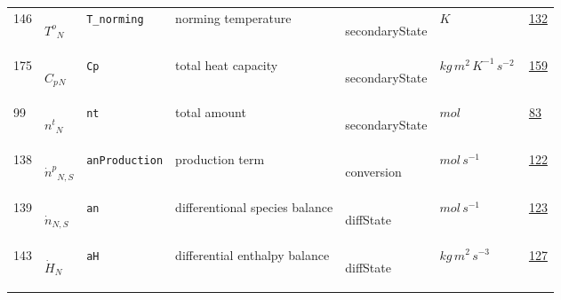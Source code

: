 \begin{longtable}{|p{1cm}|p{2.5cm}|p{4.5cm}|p{8cm}|p{3.0cm}|p{3cm}|p{1cm}|}
            146
             & \hypertarget{"v:146"}{ $ {{T^o}}{_{N}} $}
             & \verb|T_norming|
             & norming temperature
             & \begin{lay}secondaryState \end{lay}
             & $ K \, $
             &                 \hyperlink{"e:132"}{ 132 }
                 \\
            175
             & \hypertarget{"v:175"}{ $ {{C_p}}{_{N}} $}
             & \verb|Cp|
             & total heat capacity
             & \begin{lay}secondaryState \end{lay}
             & $ kg \,m^{2} \,K^{-1} \,s^{-2} \, $
             &                 \hyperlink{"e:159"}{ 159 }
                 \\
            99
             & \hypertarget{"v:99"}{ $ {{n^t}}{_{N}} $}
             & \verb|nt|
             & total amount
             & \begin{lay}secondaryState \end{lay}
             & $ mol \, $
             &                 \hyperlink{"e:83"}{ 83 }
                 \\
            138
             & \hypertarget{"v:138"}{ $ {{\dot{n}^p}}{_{N, S}} $}
             & \verb|anProduction|
             & production term
             & \begin{lay}conversion \end{lay}
             & $ mol \,s^{-1} \, $
             &                 \hyperlink{"e:122"}{ 122 }
                 \\
            139
             & \hypertarget{"v:139"}{ $ {{\dot{n}}}{_{N, S}} $}
             & \verb|an|
             & differentional species balance
             & \begin{lay}diffState \end{lay}
             & $ mol \,s^{-1} \, $
             &                 \hyperlink{"e:123"}{ 123 }
                 \\
            143
             & \hypertarget{"v:143"}{ $ {{\dot{H}}}{_{N}} $}
             & \verb|aH|
             & differential enthalpy balance
             & \begin{lay}diffState \end{lay}
             & $ kg \,m^{2} \,s^{-3} \, $
             &                 \hyperlink{"e:127"}{ 127 }
                 \\
    \end{longtable}